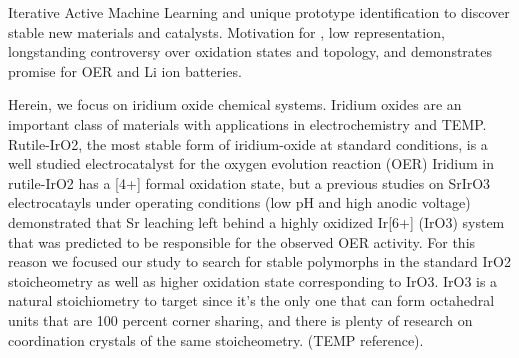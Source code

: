 Iterative Active Machine Learning and unique prototype identification to discover stable new materials and catalysts.
%
Motivation for , low representation, longstanding controversy over oxidation states and topology, and demonstrates promise for OER and Li ion batteries.


Herein, we focus on iridium oxide chemical systems.
%
Iridium oxides are an important class of materials with applications in electrochemistry and TEMP.
%
Rutile-IrO2, the most stable form of iridium-oxide at standard conditions, is a well studied electrocatalyst for the oxygen evolution reaction (OER)
Iridium in rutile-IrO2 has a [4+] formal oxidation state, but a previous studies on SrIrO3 electrocatayls  under operating conditions (low pH and high anodic voltage) demonstrated that Sr leaching left behind a highly oxidized Ir[6+] (IrO3) system that was predicted to be responsible for the observed OER activity.
%
For this reason we focused our study to search for stable polymorphs in the standard IrO2 stoicheometry  as well as higher oxidation state corresponding to IrO3.
IrO3 is a natural stoichiometry to target since it's the only one that can form octahedral units that are 100 percent corner sharing, and there is plenty of research on coordination crystals of the same stoicheometry. (TEMP reference).



